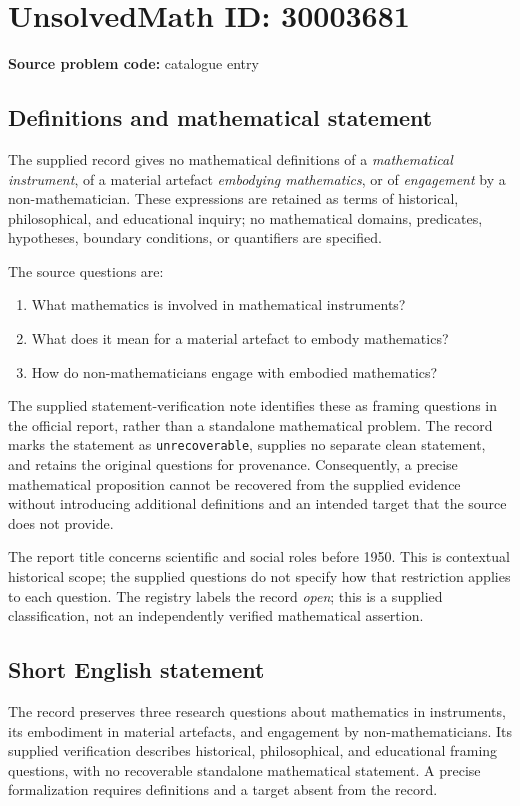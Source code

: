 \documentclass[11pt]{article}
\begin{document}
\section*{UnsolvedMath ID: 30003681}
\textbf{Source problem code:} catalogue entry
\subsection{Definitions and mathematical statement}
The supplied record gives no mathematical definitions of a \emph{mathematical instrument}, of a material artefact \emph{embodying mathematics}, or of \emph{engagement} by a non-mathematician. These expressions are retained as terms of historical, philosophical, and educational inquiry; no mathematical domains, predicates, hypotheses, boundary conditions, or quantifiers are specified.

The source questions are:
\begin{enumerate}
\item What mathematics is involved in mathematical instruments?
\item What does it mean for a material artefact to embody mathematics?
\item How do non-mathematicians engage with embodied mathematics?
\end{enumerate}

The supplied statement-verification note identifies these as framing questions in the official report, rather than a standalone mathematical problem. The record marks the statement as \texttt{unrecoverable}, supplies no separate clean statement, and retains the original questions for provenance. Consequently, a precise mathematical proposition cannot be recovered from the supplied evidence without introducing additional definitions and an intended target that the source does not provide.

The report title concerns scientific and social roles before 1950. This is contextual historical scope; the supplied questions do not specify how that restriction applies to each question. The registry labels the record \emph{open}; this is a supplied classification, not an independently verified mathematical assertion.
\subsection{Short English statement}
The record preserves three research questions about mathematics in instruments, its embodiment in material artefacts, and engagement by non-mathematicians. Its supplied verification describes historical, philosophical, and educational framing questions, with no recoverable standalone mathematical statement. A precise formalization requires definitions and a target absent from the record.
\end{document}
